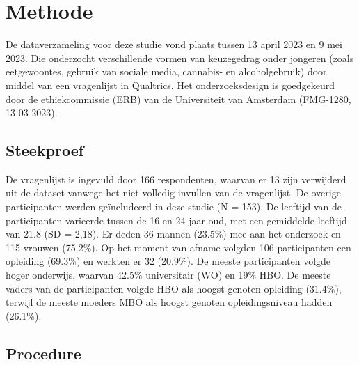 \documentclass[
  letterpaper,
  DIV=11,
  numbers=noendperiod]{scrartcl}
\begin{document}
\hypertarget{methode}{%
\section{Methode}\label{methode}}

De dataverzameling voor deze studie vond plaats tussen 13 april 2023 en
9 mei 2023. Die onderzocht verschillende vormen van keuzegedrag onder
jongeren (zoals eetgewoontes, gebruik van sociale media, cannabis- en
alcoholgebruik) door middel van een vragenlijst in Qualtrics. Het
onderzoeksdesign is goedgekeurd door de ethiekcommissie (ERB) van de
Universiteit van Amsterdam (FMG-1280, 13-03-2023).

\hypertarget{steekproef}{%
\subsection{Steekproef}\label{steekproef}}

De vragenlijst is ingevuld door 166 respondenten, waarvan er 13 zijn
verwijderd uit de dataset vanwege het niet volledig invullen van de
vragenlijst. De overige participanten werden geïncludeerd in deze studie
(N = 153). De leeftijd van de participanten varieerde tussen de 16 en 24
jaar oud, met een gemiddelde leeftijd van 21.8 (SD = 2,18). Er deden 36
mannen (23.5\%) mee aan het onderzoek en 115 vrouwen (75.2\%). Op het
moment van afname volgden 106 participanten een opleiding (69.3\%) en
werkten er 32 (20.9\%). De meeste participanten volgde hoger onderwijs,
waarvan 42.5\% universitair (WO) en 19\% HBO. De meeste vaders van de
participanten volgde HBO als hoogst genoten opleiding (31.4\%), terwijl
de meeste moeders MBO als hoogst genoten opleidingsniveau hadden
(26.1\%).

\hypertarget{procedure}{%
\subsection{Procedure}\label{procedure}}
\end{document}
